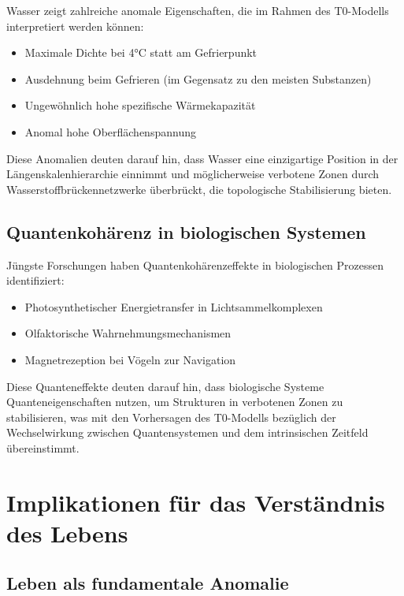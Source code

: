 \documentclass[12pt,a4paper]{article}
\begin{document}
	Wasser zeigt zahlreiche anomale Eigenschaften, die im Rahmen des T0-Modells interpretiert werden können:
	
	\begin{itemize}
		\item Maximale Dichte bei 4°C statt am Gefrierpunkt
		\item Ausdehnung beim Gefrieren (im Gegensatz zu den meisten Substanzen)
		\item Ungewöhnlich hohe spezifische Wärmekapazität
		\item Anomal hohe Oberflächenspannung
	\end{itemize}
	
	Diese Anomalien deuten darauf hin, dass Wasser eine einzigartige Position in der Längenskalenhierarchie einnimmt und möglicherweise verbotene Zonen durch Wasserstoffbrückennetzwerke überbrückt, die topologische Stabilisierung bieten.
	
	\subsection{Quantenkohärenz in biologischen Systemen}
	\label{subsec:quantum_coherence}
	
	Jüngste Forschungen haben Quantenkohärenzeffekte in biologischen Prozessen identifiziert:
	
	\begin{itemize}
		\item Photosynthetischer Energietransfer in Lichtsammelkomplexen
		\item Olfaktorische Wahrnehmungsmechanismen
		\item Magnetrezeption bei Vögeln zur Navigation
	\end{itemize}
	
	Diese Quanteneffekte deuten darauf hin, dass biologische Systeme Quanteneigenschaften nutzen, um Strukturen in verbotenen Zonen zu stabilisieren, was mit den Vorhersagen des T0-Modells bezüglich der Wechselwirkung zwischen Quantensystemen und dem intrinsischen Zeitfeld übereinstimmt.
	
	\section{Implikationen für das Verständnis des Lebens}
	\label{sec:implications}
	
	\subsection{Leben als fundamentale Anomalie}
	\label{subsec:fundamental_anomaly}
	
\end{document}

